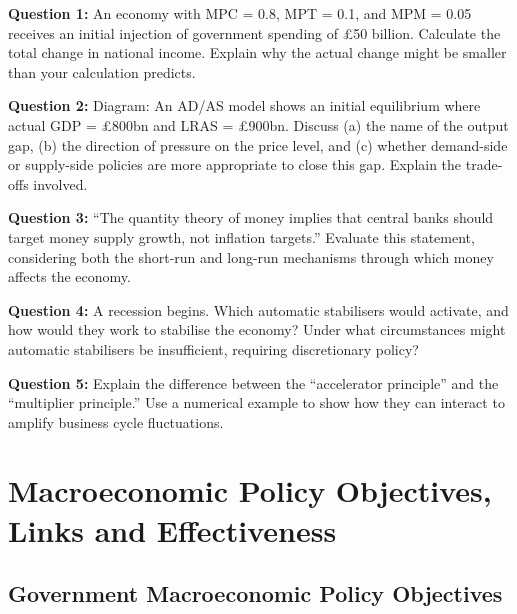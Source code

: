\documentclass[11pt, a4paper, twoside]{book}
\begin{document}
\begin{exampractice}
\textbf{Question 1:} An economy with MPC = 0.8, MPT = 0.1, and MPM = 0.05 receives an initial injection of government spending of £50 billion. Calculate the total change in national income. Explain why the actual change might be smaller than your calculation predicts.
\vspace{2.5cm}

\textbf{Question 2:} Diagram: An AD/AS model shows an initial equilibrium where actual GDP = £800bn and LRAS = £900bn. Discuss (a) the name of the output gap, (b) the direction of pressure on the price level, and (c) whether demand-side or supply-side policies are more appropriate to close this gap. Explain the trade-offs involved.
\vspace{2.5cm}

\textbf{Question 3:} ``The quantity theory of money implies that central banks should target money supply growth, not inflation targets.'' Evaluate this statement, considering both the short-run and long-run mechanisms through which money affects the economy.
\vspace{2.5cm}

\textbf{Question 4:} A recession begins. Which automatic stabilisers would activate, and how would they work to stabilise the economy? Under what circumstances might automatic stabilisers be insufficient, requiring discretionary policy?
\vspace{2.5cm}

\textbf{Question 5:} Explain the difference between the ``accelerator principle'' and the ``multiplier principle.'' Use a numerical example to show how they can interact to amplify business cycle fluctuations.
\end{exampractice}

\chapter{Macroeconomic Policy Objectives, Links and Effectiveness}

\section{Government Macroeconomic Policy Objectives}
\end{document}
